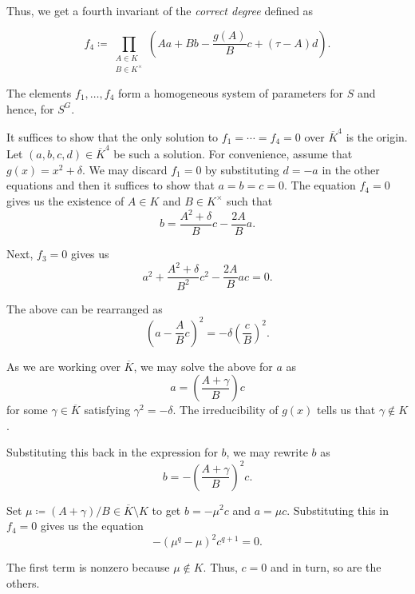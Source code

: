 \documentclass[12pt]{article}
\begin{document}
	Thus, we get a fourth invariant of the \emph{correct degree} defined as

	\begin{tcolorbox}
		\begin{equation*} 
			f_{4} \coloneqq \prod_{\substack{A \in K \\ B \in K^{\times}}} \left(Aa + Bb - \frac{g(A)}{B} c + (\tau - A) d\right).
		\end{equation*}
	\end{tcolorbox}

	\begin{thm}
		The elements $f_{1}, \ldots, f_{4}$ form a homogeneous system of parameters for $S$ and hence, for $S^{G}$.
	\end{thm}
	\begin{sketch}
		It suffices to show that the only solution to $f_{1} = \cdots = f_{4} = 0$ over $\overline{K}^{4}$ is the origin. 
		Let $(a, b, c, d) \in \overline{K}^{4}$ be such a solution. 
		For convenience, assume that $g(x) = x^{2} + \delta$. 
		We may discard $f_{1} = 0$ by substituting $d = -a$ in the other equations and then it suffices to show that $a = b = c = 0$. 
		The equation $f_{4} = 0$ gives us the existence of $A \in K$ and $B \in K^{\times}$ such that
		\begin{equation*} 
			b = \frac{A^{2} + \delta}{B} c - \frac{2A}{B} a.
		\end{equation*}

		Next, $f_{3} = 0$ gives us
		\begin{equation*} 
			a^{2} + \frac{A^{2} + \delta}{B^{2}} c^{2} - \frac{2A}{B} ac = 0.
		\end{equation*}

		The above can be rearranged as
		\begin{equation*} 
			\left(a - \frac{A}{B} c\right)^{2} = -\delta \left(\frac{c}{B}\right)^{2}.
		\end{equation*}

		As we are working over $\overline{K}$, we may solve the above for $a$ as
		\begin{equation*} 
			a = \left(\frac{A + \gamma}{B}\right) c
		\end{equation*}	
		for some $\gamma \in \overline{K}$ satisfying $\gamma^{2} = -\delta$. 
		The irreducibility of $g(x)$ tells us that $\gamma \notin K$.

		Substituting this back in the expression for $b$, we may rewrite $b$ as
		\begin{equation*} 
			b = -\left(\frac{A + \gamma}{B}\right)^{2} c.
		\end{equation*}

		Set $\mu \coloneqq (A + \gamma)/B \in \overline{K} \setminus K$ to get $b = -\mu^{2} c$ and $a = \mu c$. 
		Substituting this in $f_{4} = 0$ gives us the equation
		\begin{equation*} 
			-(\mu^{q} - \mu)^{2} c^{q + 1} = 0.
		\end{equation*}

		The first term is nonzero because $\mu \notin K$. Thus, $c = 0$ and in turn, so are the others. 
	\end{sketch}
\end{document}
